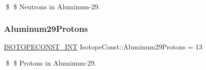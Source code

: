 \$ \$ Neutrons in Aluminum-\/29. \mbox{\label{group___isotope_const-_aluminum-_al29_ga4c029da934edd2dade522abdf12b4de5}} 
\subsubsection{\texorpdfstring{Aluminum29\+Protons}{Aluminum29Protons}}
{\footnotesize\ttfamily \mbox{\hyperlink{group___isotope_const-_macros_ga5f18360b3e99483a35c32d789e62621c}{I\+S\+O\+T\+O\+P\+E\+C\+O\+N\+S\+T\+\_\+\+I\+NT}} Isotope\+Const\+::\+Aluminum29\+Protons = 13}

\$ \$ Protons in Aluminum-\/29. 